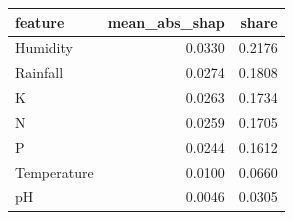 \begin{tabular}{lrr}
\toprule
feature & mean_abs_shap & share \\
\midrule
Humidity & 0.0330 & 0.2176 \\
Rainfall & 0.0274 & 0.1808 \\
K & 0.0263 & 0.1734 \\
N & 0.0259 & 0.1705 \\
P & 0.0244 & 0.1612 \\
Temperature & 0.0100 & 0.0660 \\
pH & 0.0046 & 0.0305 \\
\bottomrule
\end{tabular}
